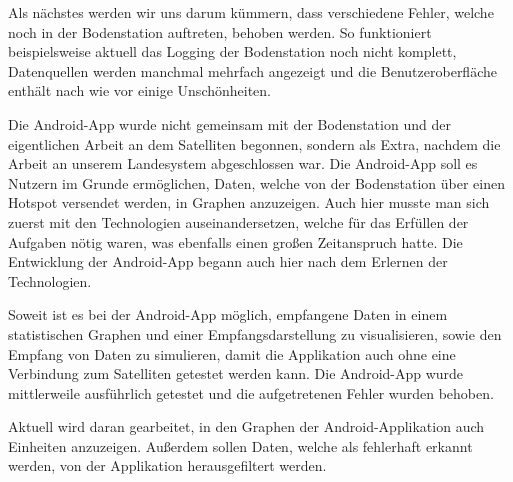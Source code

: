 Als nächstes werden wir uns darum kümmern, dass verschiedene Fehler, welche noch in der Bodenstation auftreten, behoben werden. So funktioniert beispielsweise aktuell das Logging der Bodenstation noch nicht komplett, Datenquellen werden manchmal mehrfach angezeigt und die Benutzeroberfläche enthält nach wie vor einige Unschönheiten.

Die Android-App wurde nicht gemeinsam mit der Bodenstation und der eigentlichen Arbeit an dem Satelliten begonnen, sondern als Extra, nachdem die Arbeit an unserem Landesystem abgeschlossen war. Die Android-App soll es Nutzern im Grunde ermöglichen, Daten, welche von der Bodenstation über einen Hotspot versendet werden, in Graphen anzuzeigen. Auch hier musste man sich zuerst mit den Technologien auseinandersetzen, welche für das Erfüllen der Aufgaben nötig waren, was ebenfalls einen großen Zeitanspruch hatte. Die Entwicklung der Android-App begann auch hier nach dem Erlernen der Technologien.

Soweit ist es bei der Android-App möglich, empfangene Daten in einem statistischen Graphen und einer Empfangsdarstellung zu visualisieren, sowie den Empfang von Daten zu simulieren, damit die Applikation auch ohne eine Verbindung zum Satelliten getestet werden kann. Die Android-App wurde mittlerweile ausführlich getestet und die aufgetretenen Fehler wurden behoben.

Aktuell wird daran gearbeitet, in den Graphen der Android-Applikation auch Einheiten anzuzeigen. Außerdem sollen Daten, welche als fehlerhaft erkannt werden, von der Applikation herausgefiltert werden.